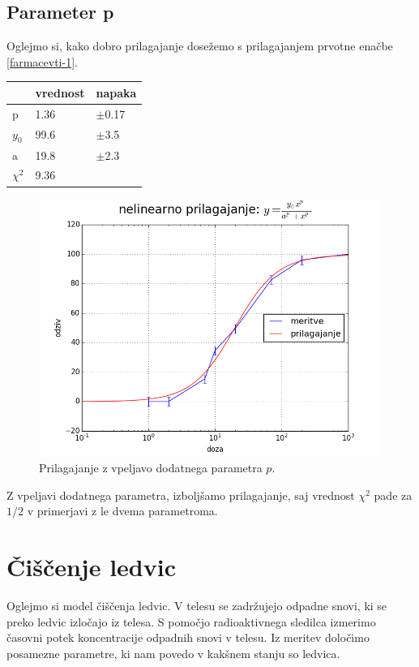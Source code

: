 \documentclass[slovene,11pt,a4paper]{article}
\numberwithin{equation}{section} %
\numberwithin{figure}{section} %
\numberwithin{table}{section} %
\begin{document}
\subsection{Parameter p}
Oglejmo si, kako dobro prilagajanje dosežemo s prilagajanjem prvotne enačbe \ref{farmacevti-1}.
\begin{table}[h]
\centering
\label{my-label}
\begin{tabular}{l|l|l|}
\cline{2-3}
                               & vrednost & napaka    \\ \hline
\multicolumn{1}{|l|}{p}        & 1.36     & $\pm$0.17 \\ \hline
\multicolumn{1}{|l|}{$y_0$}    & 99.6     & $\pm$3.5  \\ \hline
\multicolumn{1}{|l|}{a}        & 19.8     & $\pm$2.3  \\ \hline
\multicolumn{1}{|l|}{$\chi^2$} & 9.36     &           \\ \hline
\end{tabular}
\end{table}


\begin{figure}[h]
\centering
\includegraphics[scale=0.7]{slike/dodatno_parameter.png}
\caption[farmacevt-dodatni-parameter]{Prilagajanje z vpeljavo dodatnega parametra $p$.}
\label{fig:prva-2}
\end{figure}
Z vpeljavi dodatnega parametra, izboljšamo prilagajanje, saj vrednost $\chi^2$ pade za $1/2$ v primerjavi z le dvema parametroma.

\section{Čiščenje ledvic}
Oglejmo si model čiščenja ledvic. V telesu se zadržujejo odpadne snovi, ki se preko ledvic izločajo iz telesa. S pomočjo radioaktivnega sledilca izmerimo časovni potek koncentracije odpadnih snovi v telesu. Iz meritev določimo posamezne parametre, ki nam povedo v kakšnem stanju so ledvica.
\end{document}
